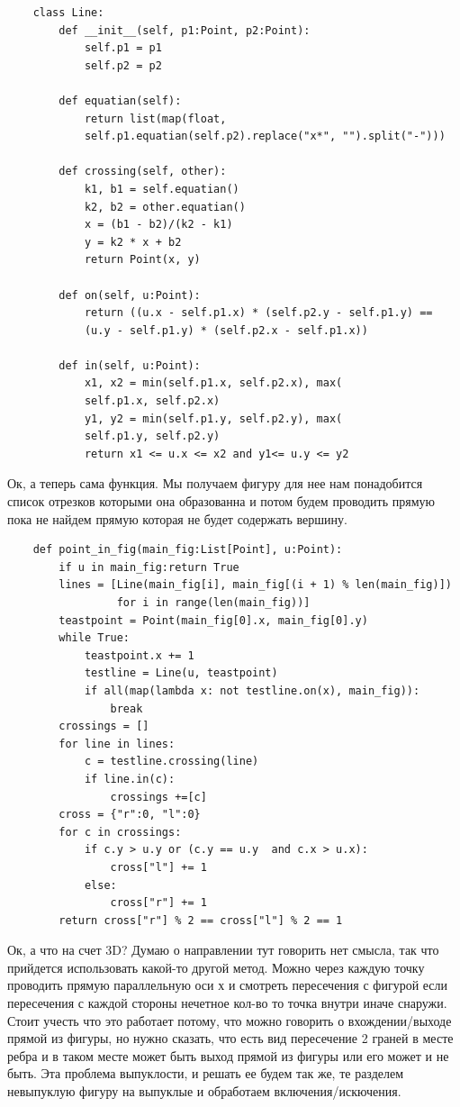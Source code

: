 \documentclass[12pt]{article} %
\begin{document}
 	\begin{verbatim}
 	class Line:
 	    def __init__(self, p1:Point, p2:Point):
 	        self.p1 = p1
 	        self.p2 = p2
 	    
 	    def equatian(self):
 	        return list(map(float, 
 	        self.p1.equatian(self.p2).replace("x*", "").split("-")))
 	    
 	    def crossing(self, other):
 	        k1, b1 = self.equatian()
 	        k2, b2 = other.equatian()
 	        x = (b1 - b2)/(k2 - k1)
 	        y = k2 * x + b2
 	        return Point(x, y)
 	    
 	    def on(self, u:Point):
 	        return ((u.x - self.p1.x) * (self.p2.y - self.p1.y) == 
 	        (u.y - self.p1.y) * (self.p2.x - self.p1.x))
 	    
 	    def in(self, u:Point):
 	        x1, x2 = min(self.p1.x, self.p2.x), max(
 	        self.p1.x, self.p2.x)
 	        y1, y2 = min(self.p1.y, self.p2.y), max(
 	        self.p1.y, self.p2.y)
 	        return x1 <= u.x <= x2 and y1<= u.y <= y2
 	\end{verbatim}
 	\hspace*{1cm}Ок, а теперь сама функция. Мы получаем фигуру для нее нам понадобится список отрезков которыми она образованна и потом будем проводить прямую пока не найдем прямую которая не будет содержать вершину.
 	\begin{verbatim}
 	def point_in_fig(main_fig:List[Point], u:Point):
 	    if u in main_fig:return True
 	    lines = [Line(main_fig[i], main_fig[(i + 1) % len(main_fig)])
 	             for i in range(len(main_fig))]
 	    teastpoint = Point(main_fig[0].x, main_fig[0].y)
 	    while True:
 	        teastpoint.x += 1
 	        testline = Line(u, teastpoint)
 	        if all(map(lambda x: not testline.on(x), main_fig)): 
 	            break
 	    crossings = []
 	    for line in lines:
 	        c = testline.crossing(line)
 	        if line.in(c):
 	            crossings +=[c]
 	    cross = {"r":0, "l":0}
 	    for c in crossings:
 	        if c.y > u.y or (c.y == u.y  and c.x > u.x):
 	            cross["l"] += 1
 	        else:
 	            cross["r"] += 1
 	    return cross["r"] % 2 == cross["l"] % 2 == 1
 	\end{verbatim}
 	\hspace*{1cm}Ок, а что на счет 3D? Думаю о направлении тут говорить нет смысла, так что прийдется использовать какой-то другой метод. Можно через каждую точку проводить прямую параллельную оси х и смотреть пересечения с фигурой если пересечения с каждой стороны нечетное кол-во то точка внутри иначе снаружи. Стоит учесть что это работает потому, что можно говорить о вхождении/выходе прямой из фигуры, но нужно сказать, что есть вид пересечение 2 граней в месте ребра и в таком месте может быть выход прямой из фигуры или его может и не быть. Эта проблема выпуклости, и решать ее будем так же, те разделем невыпуклую фигуру на выпуклые и обработаем включения/искючения.\\
\end{document}

